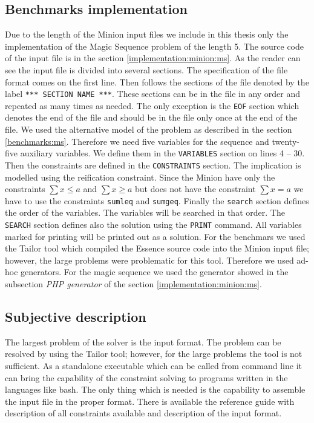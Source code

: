 \subsection{Benchmarks implementation}
Due to the length of the Minion input files we include in this thesis only the implementation
of the Magic Sequence problem of the length 5. The source code of the input file
is in the section \ref{implementation:minion:ms}. As the reader can see the input file
is divided into several sections. The specification of the file format comes on the first line.
Then follows the sections of the file denoted by the label \texttt{*** SECTION NAME ***}. These
sections can be in the file in any order and repeated as many times as needed. The
only exception is the \texttt{EOF} section which denotes the end of the file and should be in
the file only once at the end of the file. We used the alternative model of the 
problem as described in the section \ref{benchmarks:ms}. Therefore we need five 
variables for the sequence and twenty-five auxiliary variables. We define them in 
the \texttt{VARIABLES} section on lines 4 -- 30. Then the constraints are defined in the 
\texttt{CONSTRAINTS} section. The implication is modelled using the reification constraint.
Since the Minion have only the constraints $\sum{x} \leq a$ and $\sum{x} \geq a$ but
 does not have the constraint $\sum{x} = a$ we have to use the constraints \texttt{sumleq} and
 \texttt{sumgeq}. Finally the \texttt{search} section defines the order of the variables.
 The variables will be searched in that order. The \texttt{SEARCH} section defines also the
 solution using the \texttt{PRINT} command. All variables marked for printing will
 be printed out as a solution. For the benchmars we used the Tailor tool which
 compiled the Essence source code into the Minion input file; however, the large
 problems were problematic for this tool. Therefore we used ad-hoc generators. For the
 magic sequence we used the generator showed in the subsection {\em PHP generator}
 of the section \ref{implementation:minion:ms}.

\subsection{Subjective description}
The largest problem of the solver is the input format. The problem can be resolved 
by using the Tailor tool; however, for the large problems the tool is not sufficient.
As a standalone executable which can be called from command line it can bring the capability of 
the constraint solving to programs written in the languages like bash. The only
thing which is needed is the capability to assemble the input file in the proper format. 
There is available the reference guide with description of all constraints available and
description of the input format.